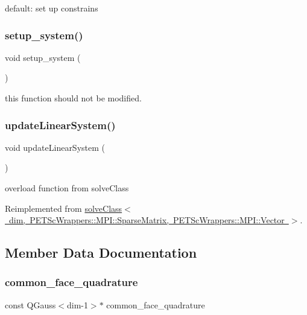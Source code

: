 default\+: set up constrains \mbox{\label{classinit_bound_val_probs_a8f0c6272cf214048329d7cf1aa58b860}} 
\subsubsection{\texorpdfstring{setup\_system()}{setup\_system()}}
{\footnotesize\ttfamily void setup\+\_\+system (\begin{DoxyParamCaption}{ }\end{DoxyParamCaption})}

this function should not be modified. \mbox{\label{classinit_bound_val_probs_af78c2c6284234c93872188334fb997d8}} 
\subsubsection{\texorpdfstring{updateLinearSystem()}{updateLinearSystem()}}
{\footnotesize\ttfamily void update\+Linear\+System (\begin{DoxyParamCaption}{ }\end{DoxyParamCaption})\hspace{0.3cm}{\ttfamily [virtual]}}

overload function from solve\+Class 

Reimplemented from \mbox{\hyperlink{classsolve_class_af78c2c6284234c93872188334fb997d8}{solve\+Class$<$ dim, P\+E\+T\+Sc\+Wrappers\+::\+M\+P\+I\+::\+Sparse\+Matrix, P\+E\+T\+Sc\+Wrappers\+::\+M\+P\+I\+::\+Vector $>$}}.



\subsection{Member Data Documentation}
\mbox{\label{classinit_bound_val_probs_af302403bba9078de92d05b4cbe6f44dd}} 
\subsubsection{\texorpdfstring{common\_face\_quadrature}{common\_face\_quadrature}}
{\footnotesize\ttfamily const Q\+Gauss$<$dim-\/1$>$$\ast$ common\+\_\+face\+\_\+quadrature}

